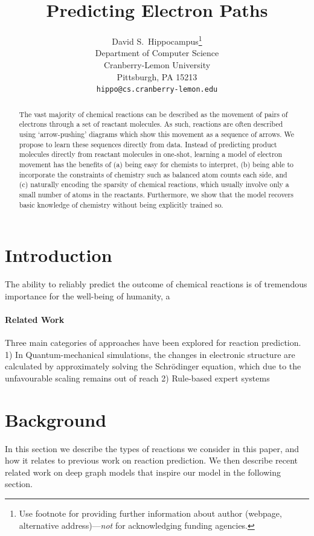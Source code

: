 \documentclass{article}
\title{Predicting Electron Paths}
\author{
  David S.~Hippocampus\thanks{Use footnote for providing further
    information about author (webpage, alternative
    address)---\emph{not} for acknowledging funding agencies.} \\
  Department of Computer Science\\
  Cranberry-Lemon University\\
  Pittsburgh, PA 15213 \\
  \texttt{hippo@cs.cranberry-lemon.edu} \\
}
\begin{document}

\maketitle

\begin{abstract}
The vast majority of chemical reactions can be described as the movement of pairs of electrons through a set of reactant molecules. 
As such, reactions are often described using `arrow-pushing' diagrams which show this movement as a sequence of arrows. We propose to learn these sequences directly from data.
Instead of predicting product molecules directly from reactant molecules in one-shot, learning a model of electron movement has the benefits of 
(a) being easy for chemists to interpret, 
(b) being able to incorporate the constraints of chemistry such as balanced atom counts each side, and 
(c) naturally encoding the sparsity of chemical reactions, which usually involve only a small number of atoms in the reactants.
Furthermore, we show that the model recovers basic knowledge of chemistry without being explicitly trained so.
\end{abstract}

\section{Introduction}

The ability to reliably predict the outcome of chemical reactions is of tremendous importance for the well-being of humanity, a %




\paragraph{Related Work} Three main categories of approaches have been explored for reaction prediction. 
1) In Quantum-mechanical simulations, the changes in electronic structure are calculated by approximately solving the Schrödinger equation, which due to the unfavourable scaling remains out of reach 2) Rule-based expert systems






\section{Background}
In this section we describe the types of reactions we consider in this paper, and how it relates to previous work on reaction prediction. We then describe recent related work on deep graph models that inspire our model in the following section.
\end{document}
